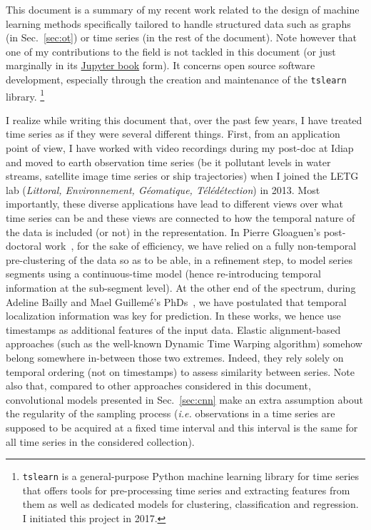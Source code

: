 This document is a summary of my recent work related to the design of
machine learning methods specifically tailored to handle structured data such
as graphs (in Sec.~\ref{sec:ot}) or time series (in the rest of the
document).
Note however that one of my contributions to the field is not tackled in
this document (or just marginally in its
\href{https://rtavenar.github.io/hdr/}{Jupyter book} form). It concerns open
source software development, especially through the creation and
maintenance of the \texttt{tslearn}~\cite{tslearn} library.%
\footnote{\texttt{tslearn} is a general-purpose Python machine learning library
    for time series that offers tools for pre-processing time series and
    extracting features from them
    as well as dedicated models for clustering, classification and regression.
    I initiated this project in 2017.}

I realize while writing this document that, over the past few years, I
have treated time series as if they were several different things.
First, from an application point of view, I have worked with video recordings
during my post-doc at Idiap and moved to earth observation time series
(be it pollutant levels in water streams, satellite image time series or ship
trajectories) when I joined the LETG lab (\emph{Littoral, Environnement,
Géomatique, Télédétection}) in 2013.
Most importantly, these diverse applications have lead to different views
over what time series can be and these views are connected to how the temporal
nature of the data is included (or not) in the representation.
In Pierre Gloaguen's post-doctoral work~\cite{gloaguen2020}, for the sake of
efficiency, we have relied on a fully
non-temporal pre-clustering of the data so as to be able, in a refinement step,
to model series segments using a continuous-time model (hence re-introducing
temporal information at the sub-segment level).
At the other end of the spectrum,
during Adeline Bailly and Mael Guillemé's
PhDs~\cite{guilleme:hal-02513295,tavenard:halshs-01561461},
we have postulated that temporal localization information was key for
prediction.
In these works, we hence use timestamps as additional features of the
input data.
Elastic alignment-based approaches (such as the well-known Dynamic Time Warping
algorithm)
somehow belong somewhere in-between those two extremes.
Indeed, they rely solely on temporal ordering
(not on timestamps) to assess similarity between series.
Note also that, compared to other approaches considered in this document,
convolutional models presented in Sec.~\ref{sec:cnn} make an
extra assumption about the regularity of the sampling process (\emph{i.e.}
observations in a time series are supposed to be acquired at a fixed time
interval and this interval is the same for all time series in the considered
collection).


